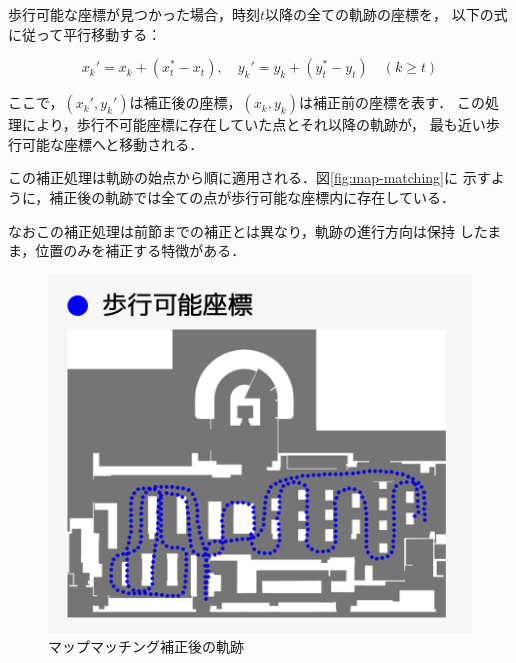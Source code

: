 歩行可能な座標が見つかった場合，時刻$t$以降の全ての軌跡の座標を，
以下の式に従って平行移動する：

\begin{equation}
x_k' = x_k + (x_t^* - x_t), \quad y_k' = y_k + (y_t^* - y_t) \quad (k \geq t)
\end{equation}

ここで，$(x_k', y_k')$は補正後の座標，$(x_k, y_k)$は補正前の座標を表す．
この処理により，歩行不可能座標に存在していた点とそれ以降の軌跡が，
最も近い歩行可能な座標へと移動される．

この補正処理は軌跡の始点から順に適用される．図\ref{fig:map-matching}に
示すように，補正後の軌跡では全ての点が歩行可能な座標内に存在している．

なおこの補正処理は前節までの補正とは異なり，軌跡の進行方向は保持
したまま，位置のみを補正する特徴がある．
\begin{figure}[H]
    \centering
    \includegraphics[width=\linewidth]{image/walkable-points.jpg}
    \caption{マップマッチング補正後の軌跡}    \label{fig:walkable-points}
\end{figure}
